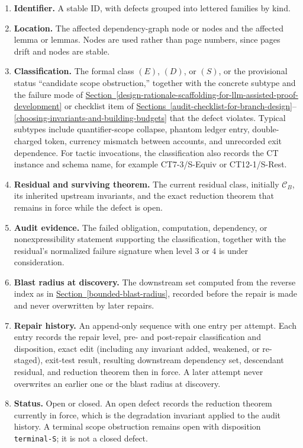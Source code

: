 \documentclass[
  11pt,
]{article}
\providecommand{\tightlist}{%
  \setlength{\itemsep}{0pt}\setlength{\parskip}{0pt}}
\theoremstyle{definition}
\newcommand{\secref}[1]{\hyperref[#1]{Section~\ref*{#1}}}
\newcommand{\secrange}[2]{\hyperref[#1]{Sections~\ref*{#1}}--\hyperref[#2]{\ref*{#2}}}
\begin{document}
\begin{enumerate}
\def\labelenumi{\arabic{enumi}.}
\tightlist
\item
  \textbf{Identifier.} A stable ID, with defects grouped into lettered
  families by kind.
\item
  \textbf{Location.} The affected dependency-graph node or nodes and the
  affected lemma or lemmas. Nodes are used rather than page numbers,
  since pages drift and nodes are stable.
\item
  \textbf{Classification.} The formal class \((E)\), \((D)\), or
  \((S)\), or the provisional status ``candidate scope obstruction,''
  together with the concrete subtype and
  the failure mode of
  \secref{design-rationale-scaffolding-for-llm-assisted-proof-development}
  or checklist item of
  \secrange{audit-checklist-for-branch-design}{choosing-invariants-and-building-budgets}
  that the defect violates. Typical subtypes include quantifier-scope
  collapse, phantom ledger entry, double-charged token, currency mismatch
  between accounts, and unrecorded exit dependence. For tactic
  invocations, the classification also records the CT instance and
  schema name, for example CT7-3/S-Equiv or CT12-1/S-Rest.
\item
  \textbf{Residual and surviving theorem.} The current residual class,
  initially \(\mathcal C_B\), its inherited upstream invariants, and the
  exact reduction theorem that remains in force while the defect is open.
\item
  \textbf{Audit evidence.} The failed obligation, computation,
  dependency, or nonexpressibility statement supporting the
  classification, together with the residual's normalized failure
  signature when level 3 or 4 is under consideration.
\item
  \textbf{Blast radius at discovery.} The downstream set computed from
  the reverse index as in \secref{bounded-blast-radius}, recorded before the repair is
  made and never overwritten by later repairs.
\item
  \textbf{Repair history.} An append-only sequence with one entry per
  attempt. Each entry records the repair level, pre- and post-repair
  classification and disposition, exact edit (including any invariant
  added, weakened, or re-staged), exit-test result, resulting downstream
  dependency set, descendant residual, and reduction theorem then in
  force. A later attempt never overwrites an earlier one or the blast
  radius at discovery.
\item
  \textbf{Status.} Open or closed. An open defect records the reduction
  theorem currently in force, which is the degradation invariant applied
  to the audit history. A terminal scope obstruction remains open with
  disposition \texttt{terminal-S}; it is not a closed defect.
\end{enumerate}
\end{document}
